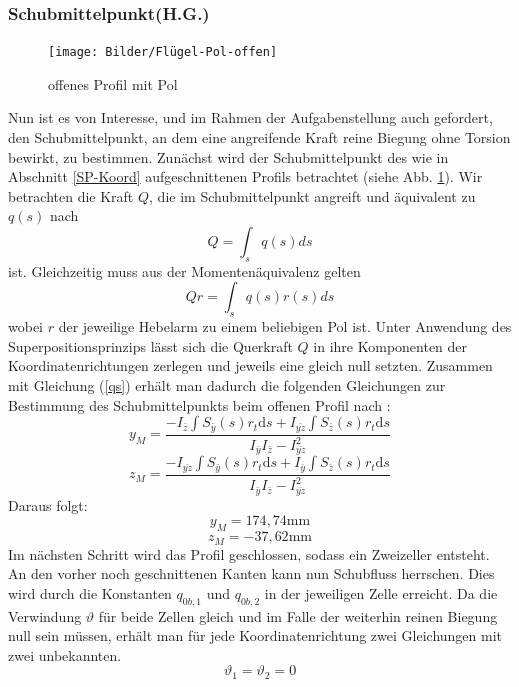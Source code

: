 \subsubsection{Schubmittelpunkt(H.G.)}
\begin{figure}[h]
	\centering
	\texttt{[image: Bilder/Flügel-Pol-offen]}
	\caption{offenes Profil mit Pol}
	\label{Fluegel2}
\end{figure}
Nun ist es von Interesse, und im Rahmen der Aufgabenstellung auch gefordert, den Schubmittelpunkt, an dem eine angreifende Kraft reine Biegung ohne Torsion bewirkt, zu bestimmen.
Zunächst wird der Schubmittelpunkt des wie in Abschnitt \ref{SP-Koord} aufgeschnittenen Profils betrachtet (siehe Abb. \ref{Fluegel2}). Wir betrachten die Kraft $Q$, die im Schubmittelpunkt angreift und äquivalent zu $q(s)$ nach
\begin{equation}
	Q=\int_{s}^{}q(s)ds
\end{equation}
ist. Gleichzeitig muss aus der Momentenäquivalenz gelten
\begin{equation}
	Qr=\int_{s}q(s)r(s)ds
\end{equation}
wobei $r$ der jeweilige Hebelarm zu einem beliebigen Pol ist. Unter Anwendung des Superpositionsprinzips lässt sich die Querkraft $Q$ in ihre Komponenten der Koordinatenrichtungen zerlegen und jeweils eine gleich null setzten. Zusammen mit Gleichung (\ref{qs}) erhält man dadurch die folgenden Gleichungen zur Bestimmung des Schubmittelpunkts beim offenen Profil nach \cite{item15}:
\begin{equation}
	y_{M}=\frac{-I_{\bar{z}}\int S_{\bar{y}}(s) r_{t}\mathrm{d}s+I_{\bar{yz}}\int S_{\bar{z}}(s) r_{t}\mathrm{d}s}{I_{\bar{y}}I_{\bar{z}}-I_{\bar{yz}}^2}
\end{equation}
\begin{equation}
	z_{M}=\frac{-I_{\bar{yz}}\int S_{\bar{y}}(s) r_{t}\mathrm{d}s+I_{\bar{y}}\int S_{\bar{z}}(s) r_{t}\mathrm{d}s}{I_{\bar{y}}I_{\bar{z}}-I_{\bar{yz}}^2}
\end{equation}
Daraus folgt:
$$
	y_{M}=174,74\mathrm{mm}
$$
$$
	z_{M}=-37,62\mathrm{mm}
$$
Im nächsten Schritt wird das Profil geschlossen, sodass ein Zweizeller entsteht. An den vorher noch geschnittenen Kanten kann nun Schubfluss herrschen. Dies wird durch die Konstanten $q_{0b,1}$ und $q_{0b,2}$ in der jeweiligen Zelle erreicht.
Da die Verwindung $\vartheta$ für beide Zellen gleich und im Falle der weiterhin reinen Biegung null sein müssen, erhält man für jede Koordinatenrichtung zwei Gleichungen mit zwei unbekannten.
\begin{equation}
	\vartheta_{1}=\vartheta_{2}=0
\end{equation}
